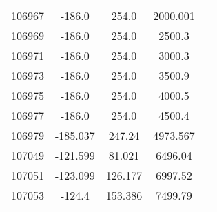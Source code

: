 \begin{table}[ht]
\begin{tabular*}{90mm}{c@{\extracolsep{\fill}}*4c}
        106967 & -186.0 & 254.0 & 2000.001\\
        106969 & -186.0 & 254.0 & 2500.3\\
        106971 & -186.0 & 254.0 & 3000.3\\
        106973 & -186.0 & 254.0 & 3500.9\\
        106975 & -186.0 & 254.0 & 4000.5\\
        106977 & -186.0 & 254.0 & 4500.4\\
        106979 & -185.037 & 247.24 & 4973.567\\
        107049 & -121.599 & 81.021 & 6496.04 \\
        107051 & -123.099 & 126.177 & 6997.52\\
        107053	&	-124.4 & 153.386 & 7499.79\\
        \bottomrule	
	\end{tabular*}
\end{table}
        
